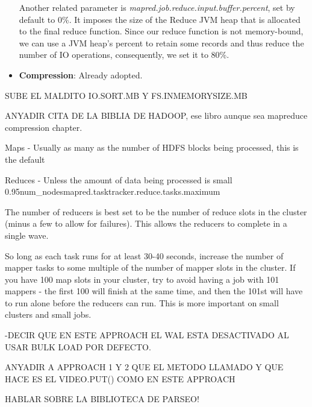 \begin{itemize}
\par 
Another related parameter is \textit{mapred.job.reduce.input.buffer.percent}, set by default to 0\%. It imposes the size of the Reduce JVM heap that is allocated to the final reduce function. Since our reduce function is not memory-bound, we can use a JVM heap's percent  to retain some records and thus reduce the number of IO operations, consequently, we set it to 80\%.





\item \textbf{Compression}: Already adopted.


\end{itemize}









SUBE EL MALDITO IO.SORT.MB Y FS.INMEMORYSIZE.MB

ANYADIR CITA DE LA BIBLIA DE HADOOP, ese libro aunque sea mapreduce compression chapter.

Maps 
- Usually as many as the number of HDFS blocks being 
processed, this is the default 

Reduces 
- Unless the amount of data being processed is small 
0.95\*num\_nodes\*mapred.tasktracker.reduce.tasks.maximum

The number of reducers is best set to be the number of reduce slots in the cluster (minus a few to allow for failures). This allows the reducers to complete in a single wave.

So long as each task runs for at least 30-40 seconds, increase the number of mapper tasks to some multiple of the number of mapper slots in the cluster. If you have 100 map slots in your cluster, try to avoid having a job with 101 mappers - the first 100 will finish at the same time, and then the 101st will have to run alone before the reducers can run. This is more important on small clusters and small jobs.

-DECIR QUE EN ESTE APPROACH EL WAL ESTA DESACTIVADO AL USAR BULK LOAD POR DEFECTO.

ANYADIR A APPROACH 1 Y 2 QUE EL METODO LLAMADO Y QUE HACE ES EL VIDEO.PUT() COMO EN ESTE APPROACH

HABLAR SOBRE LA BIBLIOTECA DE PARSEO!





